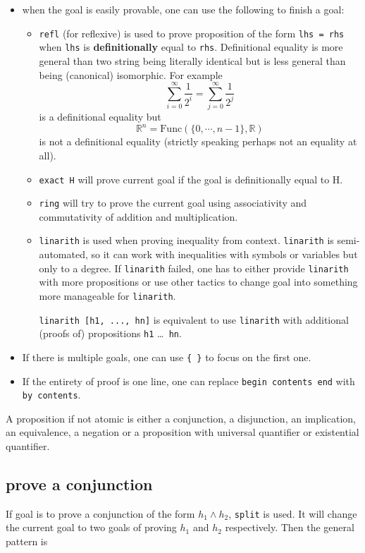 \documentclass{report}
\theoremstyle{definition}
\theoremstyle{plain}
\begin{document}
\begin{itemize}
  \item when the goal is easily provable, one can use the following to finish a goal:
  \begin{itemize}
    \item {\tt refl} (for reflexive) is used to prove proposition of the form {\tt lhs = rhs} when {\tt lhs} is {\bf definitionally} equal to {\tt rhs}. Definitional equality is more general than two string being literally identical but is less general than being (canonical) isomorphic. For example
    $$
  \sum_{i=0}^\infty \frac{1}{2^i}=\sum_{j=0}^\infty \frac{1}{2^j}
    $$
    is a definitional equality but
    $$
  \mathbb R^n = \mathrm{Func}\left(\{0,\cdots, n-1\},\mathbb R\right)
    $$ is not a definitional equality (strictly speaking perhaps not an equality at all).
    \item {\tt exact H} will prove current goal if the goal is definitionally equal to H. 
  
    \item {\tt ring} will try to prove the current goal using associativity and commutativity of addition and multiplication.
    \item {\tt linarith} is used when proving inequality from context. {\tt linarith} is semi-automated, so it can work with inequalities with symbols or variables but only to a degree. If {\tt linarith} failed, one has to either provide {\tt linarith} with more propositions or use other tactics to change goal into something more manageable for {\tt linarith}.
  
    {\tt linarith [h1, ..., hn]} is equivalent to use {\tt linarith} with additional (proofs of) propositions {\tt h1} \dots {\tt { hn}}.
  \end{itemize}

  \item If there is multiple goals, one can use {\tt \{ \}} to focus on the first one.
  \item If the entirety of proof is one line, one can replace {\tt begin contents end} with {\tt by contents}.
\end{itemize}


A proposition if not atomic is either a conjunction, a disjunction, an implication, an equivalence, a negation or a proposition with universal quantifier or existential quantifier.

\subsection{prove a conjunction}\label{lean:conj}
If goal is to prove a conjunction of the form $h_1 \land h_2$, {\tt split} is used. It will change the current goal to two goals of proving $h_1$ and $h_2$ respectively. Then the general pattern is
\end{document}
